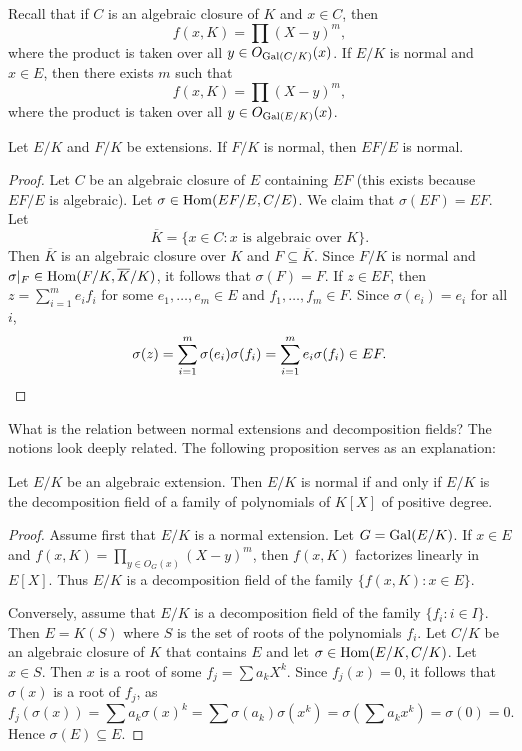 Recall that if $C$ is an algebraic closure of $K$ and $x\in C$,
then 
\[
f(x,K)=\prod(X-y)^m,
\]
where the product is taken over all 
$y\in O_{\operatorname{Gal}(C/K)}(x)$. 
If $E/K$ is normal and $x\in E$, then there exists $m$ such that 
\[
f(x,K)=\prod(X-y)^m,
\]
where the product is taken over all 
$y\in O_{\operatorname{Gal}(E/K)}(x)$. 

\begin{proposition}
    Let $E/K$ and $F/K$ be extensions. If $F/K$ 
    is normal, then $EF/E$ is normal.
\end{proposition}

\begin{proof}
    Let $C$ be an algebraic closure of $E$ containing $EF$ (this exists because $EF/E$ is algebraic). 
    Let $\sigma\in\operatorname{Hom}(EF/E,C/E)$. We claim that $\sigma(EF)=EF$. Let 
    \[
    \overline{K}=\{x\in C:x\text{ is algebraic over $K$}\}.
    \]
    Then $\overline{K}$ is an algebraic closure over $K$ and $F\subseteq\overline{K}$. 
    Since $F/K$ is normal and $\sigma|_F\in\operatorname{Hom}(F/K,\overline{K}/K)$, 
    it follows that $\sigma(F)=F$. If $z\in EF$, then
    $z=\sum_{i=1}^m e_if_i$ for some $e_1,\dots,e_m\in E$ and 
    $f_1,\dots,f_m\in F$. Since $\sigma(e_i)=e_i$ for all $i$,  
    \[
    \sigma(z)=\sum_{i=1}^m\sigma(e_i)\sigma(f_i)=\sum_{i=1}^m e_i\sigma(f_i)\in EF.\qedhere 
    \]
\end{proof}

What is the relation between 
normal extensions and decomposition fields? The notions look
deeply related. The following proposition serves as an explanation: 

\begin{proposition}
    Let $E/K$ be an algebraic extension. Then 
    $E/K$ is normal if and only if $E/K$ is the decomposition field
    of a family of polynomials of $K[X]$ of positive degree.
\end{proposition}

\begin{proof}
    Assume first that $E/K$ is a normal extension. 
    Let $G=\operatorname{Gal}(E/K)$.  If $x\in E$ and $f(x,K)=\prod_{y\in O_G(x)}(X-y)^m$, 
    then $f(x,K)$ factorizes linearly in $E[X]$. Thus 
    $E/K$ is a decomposition field of the family 
    $\{f(x,K):x\in E\}$. 
    
    Conversely, assume that $E/K$ is a decomposition field of the family 
    $\{f_i:i\in I\}$. Then $E=K(S)$ where $S$ is the set of roots
    of the polynomials $f_i$. Let $C/K$ be an algebraic closure
    of $K$ that contains $E$ and let $\sigma\in\operatorname{Hom}(E/K,C/K)$. Let $x\in S$. 
    Then $x$ is a root of some $f_j=\sum a_kX^k$. Since $f_j(x)=0$, 
    it follows that $\sigma(x)$ is a root of $f_j$, as 
    \[
    f_j(\sigma(x))=\sum a_k\sigma(x)^k
    =\sum\sigma(a_k)\sigma(x^k)
    =\sigma\left(\sum a_kx^k\right)=\sigma(0)=0.
    \]
    Hence $\sigma(E)\subseteq E$. 
\end{proof}

